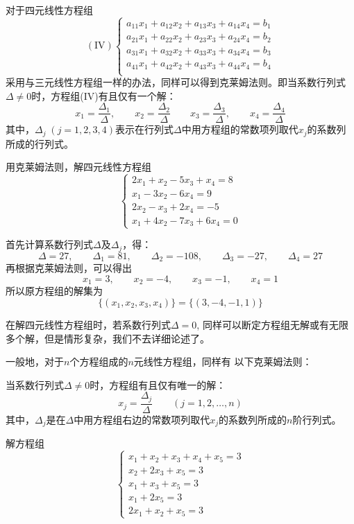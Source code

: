对于四元线性方程组
\[(\text{IV})\begin{cases}
    a_{11}x_1 +a_{12}x_2 +a_{13}x_3 +a_{14}x_4=b_1\\
    a_{21}x_1 +a_{22}x_2 +a_{23}x_3 +a_{24}x_4=b_2\\
    a_{31}x_1 +a_{32}x_2 +a_{33}x_3 +a_{34}x_4=b_3\\
    a_{41}x_1 +a_{42}x_2 +a_{43}x_3 +a_{44}x_4=b_4\\
\end{cases}\]
采用与三元线性方程组一样的办法，同样可以得到克莱姆法则。即当系数行列式$\Delta \ne 0$时，方程组(IV)有且仅有一个解：
\[x_1=\frac{\Delta_1}{\Delta},\qquad x_2=\frac{\Delta_2}{\Delta}\qquad x_3=\frac{\Delta_3}{\Delta},\qquad x_4=\frac{\Delta_4}{\Delta}\]
其中，$\Delta_j\; (j=1, 2, 3, 4)$表示在行列式$\Delta$中用方程组的常数项列取代$x_j$的系数列所成的行列式。

\begin{example}
    用克莱姆法则，解四元线性方程组
\[\begin{cases}
    2x_1+x_2-5x_3+x_4=8\\
    x_1-3x_2-6x_4=9\\
    2x_2-x_3+2x_4=-5\\
    x_1+4x_2-7x_3+6x_4=0
\end{cases}\]
\end{example}

\begin{solution}
首先计算系数行列式$\Delta$及$\Delta_j$，得：
\[\Delta=27,\qquad \Delta_1=81,\qquad \Delta_2=-108,\qquad \Delta_3=-27,\qquad \Delta_4=27\]
再根据克莱姆法则，可以得出
\[x_1=3,\qquad x_2=-4,\qquad x_3=-1,\qquad x_4=1\]
所以原方程组的解集为
\[\{(x_1,x_2,x_3,x_4)\}=\{(3,-4,-1,1)\}\]
\end{solution}

在解四元线性方程组时，若系数行列式$\Delta=0$, 同样可以断定方程组无解或有无限多个解，但是情形复杂，我们不去详细论述了。

一般地，对于$n$个方程组成的$n$元线性方程组，同样有
以下克莱姆法则：

当系数行列式$\Delta\ne 0$时，方程组有且仅有唯一的解：
\[x_j=\frac{\Delta_j}{\Delta}\qquad  (j=1,2,\ldots,n)\]
其中，$\Delta_j$是在$\Delta$中用方程组右边的常数项列取代$x_j$的系数列所成的$n$阶行列式。


\begin{example}
    解方程组
\[\begin{cases}
    x_1+x_2+x_3+x_4+x_5=3\\
    x_2+2x_3+x_5=3\\
    x_1+x_3+x_5=3\\
    x_1+2x_5=3\\
    2x_1+x_2+x_5=3
\end{cases}\]
\end{example}



